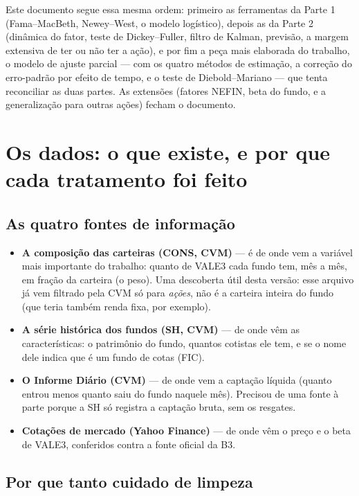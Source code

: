 \documentclass[11pt,a4paper]{article}
\begin{document}
Este documento segue essa mesma ordem: primeiro as ferramentas da Parte 1 (Fama--MacBeth,
Newey--West, o modelo logístico), depois as da Parte 2 (dinâmica do fator, teste de
Dickey--Fuller, filtro de Kalman, previsão, a margem extensiva de ter ou não ter a ação), e por
fim a peça mais elaborada do trabalho, o modelo de ajuste parcial --- com os quatro métodos de
estimação, a correção do erro-padrão por efeito de tempo, e o teste de Diebold--Mariano --- que
tenta reconciliar as duas partes. As extensões (fatores NEFIN, beta do fundo, e a generalização
para outras ações) fecham o documento.

\section{Os dados: o que existe, e por que cada tratamento foi feito}

\subsection{As quatro fontes de informação}

\begin{itemize}[topsep=2pt,itemsep=3pt]
\item \textbf{A composição das carteiras (CONS, CVM)} --- é de onde vem a variável mais
importante do trabalho: quanto de VALE3 cada fundo tem, mês a mês, em fração da carteira (o
peso). Uma descoberta útil desta versão: esse arquivo já vem filtrado pela CVM só para
\emph{ações}, não é a carteira inteira do fundo (que teria também renda fixa, por exemplo).
\item \textbf{A série histórica dos fundos (SH, CVM)} --- de onde vêm as características: o
patrimônio do fundo, quantos cotistas ele tem, e se o nome dele indica que é um fundo de cotas
(FIC).
\item \textbf{O Informe Diário (CVM)} --- de onde vem a captação líquida (quanto entrou menos
quanto saiu do fundo naquele mês). Precisou de uma fonte à parte porque a SH só registra a
captação bruta, sem os resgates.
\item \textbf{Cotações de mercado (Yahoo Finance)} --- de onde vêm o preço e o beta de VALE3,
conferidos contra a fonte oficial da B3.
\end{itemize}

\subsection{Por que tanto cuidado de limpeza}
\end{document}
